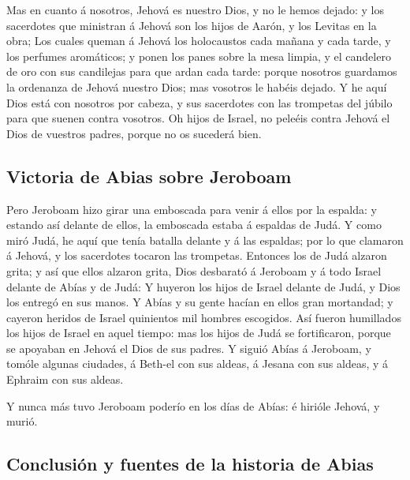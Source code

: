 Mas en cuanto á nosotros, Jehová es nuestro Dios, y no
le hemos dejado: y los sacerdotes que ministran á Jehová son los hijos
de Aarón, y los Levitas en la obra;  Los cuales queman á
Jehová los holocaustos cada mañana y cada tarde, y los perfumes
aromáticos; y ponen los panes sobre la mesa limpia, y el candelero de
oro con sus candilejas para que ardan cada tarde: porque nosotros
guardamos la ordenanza de Jehová nuestro Dios; mas vosotros le habéis
dejado.  Y he aquí Dios está con nosotros por cabeza, y
sus sacerdotes con las trompetas del júbilo para que suenen contra
vosotros. Oh hijos de Israel, no peleéis contra Jehová el Dios de
vuestros padres, porque no os sucederá bien.

\hypertarget{victoria-de-abias-sobre-jeroboam}{%
\subsection{Victoria de Abias sobre
Jeroboam}\label{victoria-de-abias-sobre-jeroboam}}

 Pero Jeroboam hizo girar una emboscada para venir á
ellos por la espalda: y estando así delante de ellos, la emboscada
estaba á espaldas de Judá.  Y como miró Judá, he aquí que
tenía batalla delante y á las espaldas; por lo que clamaron á Jehová, y
los sacerdotes tocaron las trompetas.  Entonces los de
Judá alzaron grita; y así que ellos alzaron grita, Dios desbarató á
Jeroboam y á todo Israel delante de Abías y de Judá:  Y
huyeron los hijos de Israel delante de Judá, y Dios los entregó en sus
manos.  Y Abías y su gente hacían en ellos gran
mortandad; y cayeron heridos de Israel quinientos mil hombres escogidos.
 Así fueron humillados los hijos de Israel en aquel
tiempo: mas los hijos de Judá se fortificaron, porque se apoyaban en
Jehová el Dios de sus padres.  Y siguió Abías á Jeroboam,
y tomóle algunas ciudades, á Beth-el con sus aldeas, á Jesana con sus
aldeas, y á Ephraim con sus aldeas.

 Y nunca más tuvo Jeroboam poderío en los días de Abías:
é hirióle Jehová, y murió.

\hypertarget{conclusiuxf3n-y-fuentes-de-la-historia-de-abias}{%
\subsection{Conclusión y fuentes de la historia de
Abias}\label{conclusiuxf3n-y-fuentes-de-la-historia-de-abias}}

